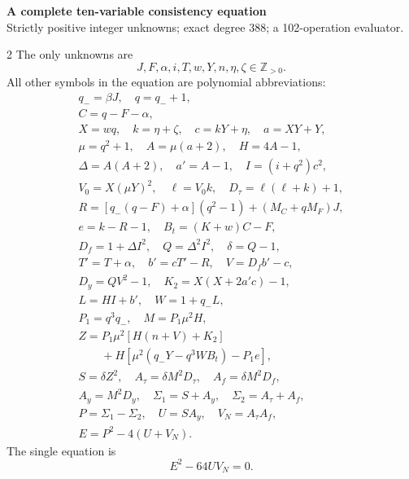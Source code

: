 \documentclass[10pt]{article}
\begin{document}
\begin{center}
{\large\bfseries A complete ten-variable consistency equation}\\[-1pt]
{\small Strictly positive integer unknowns; exact degree 388; a 102-operation evaluator.}
\end{center}\vspace{-8pt}
\begin{multicols}{2}
\fontsize{9}{9.5}\selectfont
The only unknowns are
\[
J,F,\alpha,i,T,w,Y,n,\eta,\zeta\in\mathbb Z_{>0}.
\]
All other symbols in the equation are polynomial abbreviations:
\[
\begin{gathered}
q_-=\beta J,\quad q=q_-+1,\\
C=q-F-\alpha,\\
X=wq,\quad k=\eta+\zeta,\quad c=kY+\eta,\quad a=XY+Y,\\
\mu=q^2+1,\quad A=\mu(a+2),\quad H=4A-1,\\
\Delta=A(A+2),\quad a'=A-1,\quad I=(i+q^2)c^2,\\
V_0=X(\mu Y)^2,\quad\ell=V_0k,\quad D_\tau=\ell(\ell+k)+1,\\
R=[q_-(q-F)+\alpha](q^2-1)+(M_C+qM_F)J,\\
e=k-R-1,\quad B_t=(K+w)C-F,\\
D_f=1+\Delta I^2,\quad Q=\Delta^2I^2,\quad\delta=Q-1,\\
T'=T+\alpha,\quad b'=cT'-R,\quad V=D_fb'-c,\\
D_y=QV^2-1,\quad K_2=X(X+2a'c)-1,\\
L=HI+b',\quad W=1+q_-L,\\
P_1=q^3q_-,\quad M=P_1\mu^2H,\\
Z=P_1\mu^2[H(n+V)+K_2]\\
\qquad+H[\mu^2(q_-Y-q^3WB_t)-P_1e],\\
S=\delta Z^2,\quad A_\tau=\delta M^2D_\tau,\quad A_f=\delta M^2D_f,\\
A_y=M^2D_y,\quad\Sigma_1=S+A_y,\quad\Sigma_2=A_\tau+A_f,\\
P=\Sigma_1-\Sigma_2,\quad U=SA_y,\quad V_N=A_\tau A_f,\\
E=P^2-4(U+V_N).
\end{gathered}
\]
The single equation is
\[
\boxed{E^2-64UV_N=0.}
\]


\end{multicols}
\end{document}
